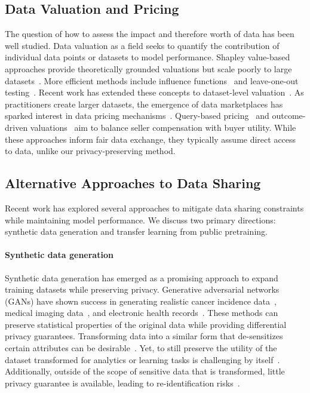 \subsection{Data Valuation and Pricing}
The question of how to assess the impact and therefore worth of data has been well studied. Data valuation as a field seeks to quantify the contribution of individual data points or datasets to model performance. Shapley value-based approaches provide theoretically grounded valuations but scale poorly to large datasets~\cite{ghorbani2019data}. More efficient methods include influence functions~\cite{koh2017understanding} and leave-one-out testing~\cite{cook1979influential}. Recent work has extended these concepts to dataset-level valuation~\cite{jia2019towards}. As practitioners create larger datasets, the emergence of data marketplaces has sparked interest in data pricing mechanisms~\cite{kumar2020marketplace}. Query-based pricing~\cite{koutris2015query} and outcome-driven valuations~\cite{radic2024pricing} aim to balance seller compensation with buyer utility. While these approaches inform fair data exchange, they typically assume direct access to data, unlike our privacy-preserving method.


\subsection{Alternative Approaches to Data Sharing}
Recent work has explored several approaches to mitigate data sharing constraints while maintaining model performance. We discuss two primary directions: synthetic data generation and transfer learning from public pretraining.

\paragraph{Synthetic data generation}
Synthetic data generation has emerged as a promising approach to expand training datasets while preserving privacy. Generative adversarial networks (GANs) have shown success in generating realistic cancer incidence data~\cite{goncalves2020generation}, medical imaging data~\cite{thambawita2022singan}, and electronic health records~\cite{baowaly2019synthesizing}. These methods can preserve statistical properties of the original data while providing differential privacy guarantees. Transforming data into a similar form that de-sensitizes certain attributes can be desirable~\cite{drechsler2011synthetic, howe2017synthetic, nikolenko2021synthetic, gonzales2023synthetic, sweeney2002k}. Yet, to still preserve the utility of the dataset transformed for analytics or learning tasks is challenging by itself~\cite{jordon2021hide}. Additionally, outside of the scope of sensitive data that is transformed, little privacy guarantee is available, leading to re-identification risks~\cite{narayanan2006break, jordon2021hide}.


